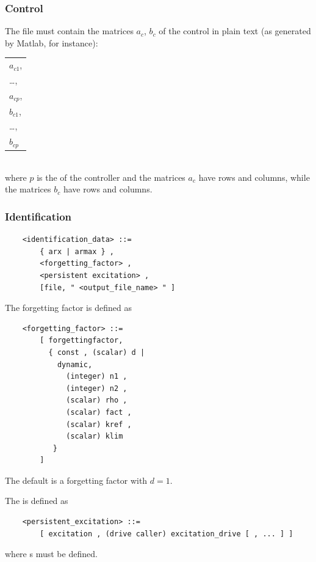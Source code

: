 \subsubsection{Control}
The file  must contain the matrices
$ a_c $, $ b_c $ of the control in plain text (as generated by Matlab, for
instance):

\noindent
\begin{tabular}{l}
    $ a_{c1} $, \\
    \ldots,     \\
    $ a_{cp} $, \\
    $ b_{c1} $, \\
    \ldots,     \\
    $ b_{cp} $  \\
\end{tabular} \\
where $ p $ is the  of the controller and the matrices $ a_c $
have  rows and  columns, while the
matrices $ b_c $ have  rows and  columns.

\subsubsection{Identification}
\begin{verbatim}
    <identification_data> ::=
        { arx | armax } ,
        <forgetting_factor> ,
        <persistent excitation> ,
        [file, " <output_file_name> " ]
\end{verbatim}
The forgetting factor is defined as
\begin{verbatim}
    <forgetting_factor> ::=
        [ forgettingfactor,
          { const , (scalar) d |
            dynamic,
              (integer) n1 ,
              (integer) n2 ,
              (scalar) rho ,
              (scalar) fact ,
              (scalar) kref ,
              (scalar) klim
           }
        ]    
\end{verbatim}
The default is a  forgetting factor with $d=1$.

The  is defined as
\begin{verbatim}
    <persistent_excitation> ::=
        [ excitation , (drive caller) excitation_drive [ , ... ] ]
\end{verbatim}
where  s must be defined.

